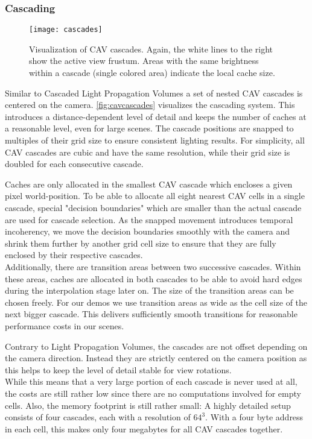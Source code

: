 \documentclass[thesis.tex]{subfiles}
\begin{document}
\subsubsection{Cascading} \label{sec:impl:cavcascading}
\begin{figure}[h]
	\centering
	\texttt{[image: cascades]}
	\caption{Visualization of CAV cascades. Again, the white lines to the right show the active view frustum.
	Areas with the same brightness within a cascade (single colored area) indicate the local cache size.
	} \label{fig:cavcascades}
\end{figure}
Similar to Cascaded Light Propagation Volumes \cite{bib:lpt} a set of nested CAV cascades is centered on the camera.
\autoref{fig:cavcascades} visualizes the cascading system.
This introduces a distance-dependent level of detail and keeps the number of caches at a reasonable level, even for large scenes.
The cascade positions are snapped to multiples of their grid size to ensure consistent lighting results. %
For simplicity, all CAV cascades are cubic and have the same resolution, while their grid size is doubled for each consecutive cascade.

Caches are only allocated in the smallest CAV cascade which encloses a given pixel world-position.
To be able to allocate all eight nearest CAV cells in a single cascade, special "decision boundaries" which are smaller than the actual cascade are used for cascade selection.
As the snapped movement introduces temporal incoherency, we move the decision boundaries smoothly with the camera and shrink them further by another grid cell size to ensure that they are fully enclosed by their respective cascades.
\\
Additionally, there are transition areas between two successive cascades.
Within these areas, caches are allocated in both cascades to be able to avoid hard edges during the interpolation stage later on.
The size of the transition areas can be chosen freely.
For our demos we use transition areas as wide as the cell size of the next bigger cascade. %
This delivers sufficiently smooth transitions for reasonable performance costs in our scenes.

Contrary to Light Propagation Volumes, the cascades are not offset depending on the camera direction.
Instead they are strictly centered on the camera position as this helps to keep the level of detail stable for view rotations.\\
While this means that a very large portion of each cascade is never used at all, the costs are still rather low since there are no computations involved for empty cells.
Also, the memory footprint is still rather small: %
A highly detailed setup consists of four cascades, each with a resolution of $64^3$.
With a four byte address in each cell, this makes only four megabytes for all CAV cascades together.
\end{document}
